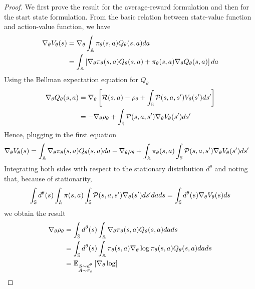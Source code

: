 \begin{proof}
	We first prove the result for the average-reward formulation and then for the start state formulation. From the basic relation between state-value function and action-value function, we have
	\begin{equation*}
		\begin{split}
			\nabla_\theta V_\theta(s) &= \nabla_\theta \int_{\A} \pi_\theta(s,a) Q_\theta(s,a) da\\
				&= \int_{\A} \left[ \nabla_\theta \pi_\theta(s,a) Q_\theta(s,a) + \pi_\theta(s,a) \nabla_\theta Q_\theta(s,a)\right] da
		\end{split}
	\end{equation*} 
	Using the Bellman expectation equation for $Q_\theta$ 
	\begin{equation*}
		\begin{split}
			\nabla_\theta Q_\theta(s,a) &= \nabla_\theta \left[ \calR(s,a) - \rho_\theta + \int_{\S} \calP(s,a,s') V_\theta(s') ds' \right]\\
			&= -\nabla_\theta \rho_\theta + \int_{\S} \calP(s,a,s') \nabla_\theta V_\theta(s') ds'
		\end{split}
	\end{equation*}
	Hence, plugging in the first equation 
	\begin{equation*}
		\begin{split}
			\nabla_\theta V_\theta(s) &= \int_{\A} \nabla_\theta \pi_\theta(s,a) Q_\theta(s,a) da - \nabla_\theta \rho_\theta + \int_\A \pi_\theta(s,a) \int_{\S} \calP(s,a,s') \nabla_\theta V_\theta(s') ds' 
		\end{split}
	\end{equation*} 	
	Integrating both sides with respect to the stationary distribution $d^\theta$ and noting that, because of stationarity,  
	\begin{equation*}
		\int_{\S} d^\theta(s) \int_{\A} \pi(s,a) \int_{\S} \calP(s,a,s') \nabla_\theta(s') ds' da ds = \int_{\S} d^\theta(s) \nabla_\theta V_\theta(s) ds
	\end{equation*}
	we obtain the result 
	\begin{equation*}
		\begin{split}
		\nabla_\theta \rho_\theta &= \int_{\S} d^\theta(s) \int_{\A} \nabla_\theta \pi_\theta(s,a) Q_\theta(s,a) da ds\\
		&= \int_{\S} d^\theta(s) \int_{\A} \pi_\theta(s,a) \nabla_\theta \log\pi_\theta(s,a) Q_\theta(s,a) da ds\\
		&= \E[\substack{S \sim d^\theta\\A \sim \pi_\theta}]{\nabla_\theta\log
}
\end{split}
\end{equation*}
\end{proof}

